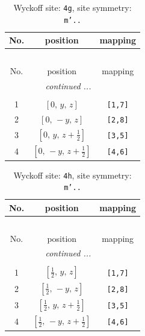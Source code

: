 \documentclass[fleqn,8pt]{jsarticle}
\begin{document}
\renewcommand{\arraystretch}{1.2}
\begin{longtable}{ccc}
\caption{Wyckoff site: {\tt 4g}, site symmetry: {\tt m'..}}
 \\
 \hline \hline
No. & position & mapping \\ \hline \endfirsthead

\multicolumn{2}{l}{\tablename\ \thetable{}} \\
 \hline \hline
No. & position & mapping \\ \hline \endhead

 \hline \hline
\multicolumn{2}{r}{\footnotesize\it continued ...} \\ \endfoot

 \hline \hline
\multicolumn{2}{r}{} \\ \endlastfoot

1 & $\left[ 0,\, y,\, z \right]$ & {\tt [1,7]} \\ \hline
2 & $\left[ 0,\, - y,\, z \right]$ & {\tt [2,8]} \\ \hline
3 & $\left[ 0,\, y,\, z + \frac{1}{2} \right]$ & {\tt [3,5]} \\ \hline
4 & $\left[ 0,\, - y,\, z + \frac{1}{2} \right]$ & {\tt [4,6]} \\
\end{longtable}
\renewcommand{\arraystretch}{1.2}
\begin{longtable}{ccc}
\caption{Wyckoff site: {\tt 4h}, site symmetry: {\tt m'..}}
 \\
 \hline \hline
No. & position & mapping \\ \hline \endfirsthead

\multicolumn{2}{l}{\tablename\ \thetable{}} \\
 \hline \hline
No. & position & mapping \\ \hline \endhead

 \hline \hline
\multicolumn{2}{r}{\footnotesize\it continued ...} \\ \endfoot

 \hline \hline
\multicolumn{2}{r}{} \\ \endlastfoot

1 & $\left[ \frac{1}{2},\, y,\, z \right]$ & {\tt [1,7]} \\ \hline
2 & $\left[ \frac{1}{2},\, - y,\, z \right]$ & {\tt [2,8]} \\ \hline
3 & $\left[ \frac{1}{2},\, y,\, z + \frac{1}{2} \right]$ & {\tt [3,5]} \\ \hline
4 & $\left[ \frac{1}{2},\, - y,\, z + \frac{1}{2} \right]$ & {\tt [4,6]} \\
\end{longtable}
\end{document}
